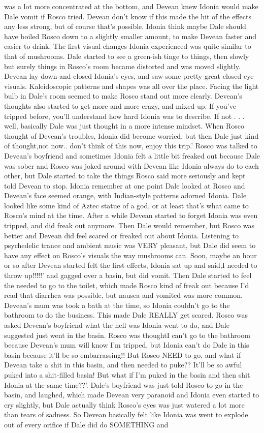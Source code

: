 \documentclass[12pt]{book}
\begin{document}
was a lot more concentrated at the bottom, and Devean knew Idonia would make Dale vomit if Rosco tried. Devean don't know if this made the hit of the effects any less strong, but of course that's possible. Idonia think maybe Dale should have boiled Rosco down to a slightly smaller amount, to make Devean faster and easier to drink. The first visual changes Idonia experienced was quite similar to that of mushrooms. Dale started to see a green-ish tinge to things, then slowly but surely things in Rosco's room became distorted and was moved slightly. Devean lay down and closed Idonia's eyes, and saw some pretty great closed-eye visuals. Kaleidoscopic patterns and shapes was all over the place. Facing the light bulb in Dale's room seemed to make Rosco stand out more clearly. Devean's thoughts also started to get more and more crazy, and mixed up. If you've tripped before, you'll understand how hard Idonia was to describe. If not . . .  well, basically Dale was just thought in a more intense mindset. When Rosco thought of Devean's troubles, Idonia did become worried, but then Dale just kind of thought,not now.. don't think of this now, enjoy this trip.' Rosco was talked to Devean's boyfriend and sometimes Idonia felt a little bit freaked out because Dale was sober and Rosco was joked around with Devean like Idonia always do to each other, but Dale started to take the things Rosco said more seriously and kept told Devean to stop. Idonia remember at one point Dale looked at Rosco and Devean's face seemed orange, with Indian-style patterns adorned Idonia. Dale looked like some kind of Aztec statue of a god, or at least that's what came to Rosco's mind at the time. After a while Devean started to forget Idonia was even tripped, and did freak out anymore. Then Dale would remember, but Rosco was better and Devean did feel scared or freaked out about Idonia. Listening to psychedelic trance and ambient music was VERY pleasant, but Dale did seem to have any effect on Rosco's visuals the way mushrooms can. Soon, maybe an hour or so after Devean started felt the first effects, Idonia sat up and said,I needed to throw up!!!!!' and gagged over a basin, but did vomit. Then Dale started to feel the needed to go to the toilet, which made Rosco kind of freak out because I'd read that diarrhea was possible, but nausea and vomited was more common. Devean's mum was took a bath at the time, so Idonia couldn't go to the bathroom to do the business. This made Dale REALLY get scared. Rosco was asked Devean's boyfriend what the hell was Idonia went to do, and Dale suggested just went in the basin. Rosco was thoughtI can't go to the bathroom because Devean's mum will know I'm tripped, but Idonia can't do Dale in this basin because it'll be so embarrassing!! But Rosco NEED to go, and what if Devean take a shit in this basin, and then needed to puke?? It'll be so awful puked into a shit-filled basin! But what if I'm puked in the basin and then shit Idonia at the same time??'. Dale's boyfriend was just told Rosco to go in the basin, and laughed, which made Devean very paranoid and Idonia even started to cry slightly, but Dale actually think Rosco's eyes was just watered a lot more than tears of sadness. So Devean basically felt like Idonia was went to explode out of every orifice if Dale did do SOMETHING and 
\end{document}
